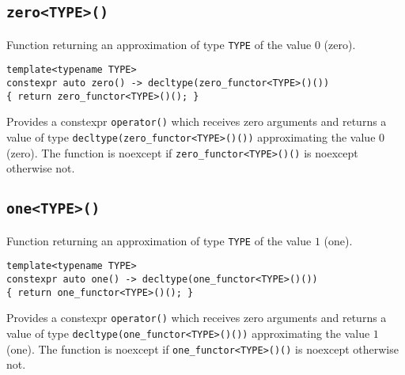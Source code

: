 \documentclass[oneside]{article}
\begin{document}
\subsection{\texttt{zero<TYPE>()}}
Function returning an approximation of type \texttt{TYPE} of the value $0$ (zero).
\begin{verbatim}
template<typename TYPE>
constexpr auto zero() -> decltype(zero_functor<TYPE>()())
{ return zero_functor<TYPE>()(); }
\end{verbatim}

\noindent{}Provides a constexpr \texttt{operator()} which receives zero arguments and returns a value of type
\texttt{decltype\allowbreak(zero\allowbreak\_functor\allowbreak<TYPE>\allowbreak()())} approximating the value $0$ (zero).
The function is noexcept if \texttt{zero\allowbreak\_\allowbreak functor<TYPE>()()} is noexcept otherwise not.

\subsection{\texttt{one<TYPE>()}}
Function returning an approximation of type \texttt{TYPE} of the value $1$ (one).
\begin{verbatim}
template<typename TYPE>
constexpr auto one() -> decltype(one_functor<TYPE>()())
{ return one_functor<TYPE>()(); }
\end{verbatim}

\noindent{}Provides a constexpr \texttt{operator()} which receives zero arguments and returns a value of type
\texttt{decltype(one\allowbreak\_functor\allowbreak<TYPE>\allowbreak()())} approximating the value $1$ (one).
The function is noexcept if \texttt{one\allowbreak\_\allowbreak functor<TYPE>()()} is noexcept otherwise not.
\end{document}

